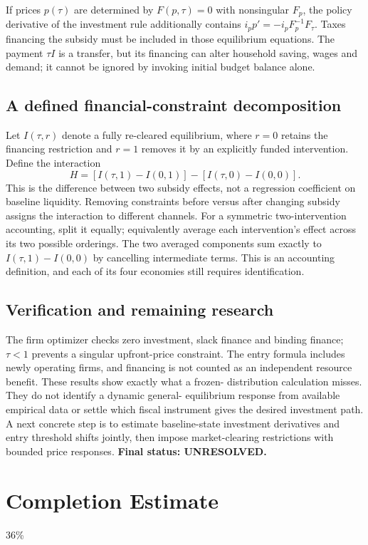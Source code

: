 \documentclass[11pt]{article}
\begin{document}
If prices $p(\tau)$ are determined by $F(p,\tau)=0$ with nonsingular
$F_p$, the policy derivative of the investment rule additionally contains
$i_p p'=-i_pF_p^{-1}F_\tau$. Taxes financing the subsidy must be included
in those equilibrium equations. The payment $\tau I$ is a transfer, but
its financing can alter household saving, wages and demand; it cannot be
ignored by invoking initial budget balance alone.

\subsection*{A defined financial-constraint decomposition}
Let $I(\tau,r)$ denote a fully re-cleared equilibrium, where $r=0$ retains
the financing restriction and $r=1$ removes it by an explicitly funded
intervention. Define the interaction
\[
 H=[I(\tau,1)-I(0,1)]-[I(\tau,0)-I(0,0)].
\]
This is the difference between two subsidy effects, not a regression
coefficient on baseline liquidity. Removing constraints before versus
after changing subsidy assigns the interaction to different channels.
For a symmetric two-intervention accounting, split it equally; equivalently
average each intervention's effect across its two possible orderings.
The two averaged components sum exactly to $I(\tau,1)-I(0,0)$ by
cancelling intermediate terms. This is an accounting definition, and each
of its four economies still requires identification.

\subsection*{Verification and remaining research}
The firm optimizer checks zero investment, slack finance and binding
finance; $\tau<1$ prevents a singular upfront-price constraint. The entry
formula includes newly operating firms, and financing is not counted as
an independent resource benefit. These results show exactly what a frozen-
distribution calculation misses. They do not identify a dynamic general-
equilibrium response from available empirical data or settle which fiscal
instrument gives the desired investment path. A next concrete step is to
estimate baseline-state investment derivatives and entry threshold shifts
jointly, then impose market-clearing restrictions with bounded price
responses. \textbf{Final status: UNRESOLVED.}

\section{Completion Estimate}
36\%
\end{document}
